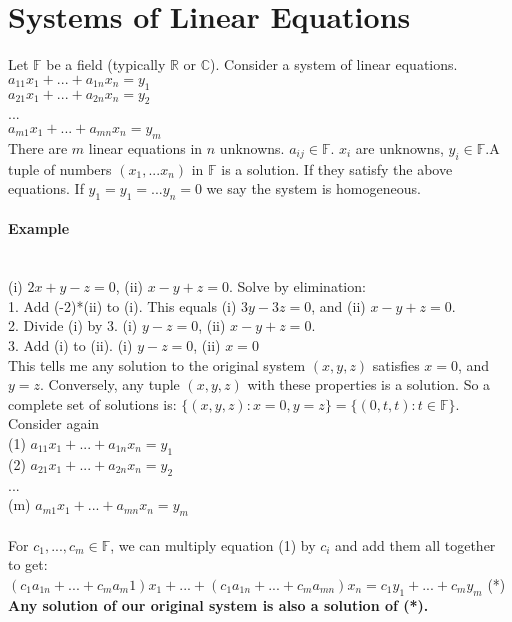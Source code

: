 \documentclass[10pt,letter]{article}
\begin{document}
\section*{Systems of Linear Equations}
Let $\mathbb{F}$ be a field (typically $\mathbb{R}$ or $\mathbb{C}$). Consider a system of linear equations.\\  $a_{11}x_1 + ... +a_{1n}x_n = y_1$ \\ 
$a_{21}x_1 + ... +a_{2n}x_n = y_2$\\ 
... \\ 
$a_{m1}x_1 + ... +a_{mn}x_n = y_m$ \\ 
There are $m$ linear equations in $n$ unknowns. $a_{ij}\in\mathbb{F}$. $x_i$ are unknowns, $y_i\in\mathbb{F}$.A tuple of numbers $(x_1,...x_n)$ in $\mathbb{F}$ is a solution. If they satisfy the above equations. If $y_1=y_1=...y_n=0$ we say the system is homogeneous. 

\paragraph{Example}\mbox{}\\ 
(i) $2x+y-z = 0$, (ii) $x-y+z=0$. Solve by elimination: \\ 
1. Add (-2)*(ii) to (i). This equals (i) $3y - 3z = 0$, and (ii) $x-y+z=0$. \\ 
2. Divide (i) by 3. (i) $y-z =0$, (ii) $x-y+z=0$.\\ 
3. Add (i) to (ii). (i) $y-z=0$, (ii) $x=0$ \\ 
This tells me any solution to the original system $(x,y,z)$ satisfies $x=0$, and $y=z$. Conversely, any tuple $(x,y,z)$ with these properties is a solution. So a complete set of solutions is: $\{(x,y,z): x=0, y=z\} = \{(0,t,t): t\in\mathbb{F}\}$.\\ 

Consider again \\
(1) $a_{11}x_1 + ... +a_{1n}x_n = y_1$ \\ 
(2) $a_{21}x_1 + ... +a_{2n}x_n = y_2$\\ 
... \\ 
(m) $a_{m1}x_1 + ... +a_{mn}x_n = y_m$ \\ \\
For $c_1,...,c_m\in\mathbb{F}$, we can multiply equation (1) by $c_i$ and add them all together to get: $(c_1a_{1n}+...+c_ma_m1)x_1+...+(c_1a_{1n}+...+c_ma_{mn})x_n = c_1y_1+...+c_my_m$ (*)\\ 
\textbf{Any solution of our original system is also a solution of (*).}
\end{document}
